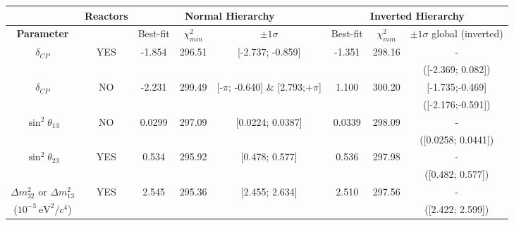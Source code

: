 \begin{table}[htb]
\centering
\begin{tabular}{| c | c || c | c | c || c | c | c |}
\hline
								& {\bf Reactors}		& \multicolumn{3}{c||}{\bf Normal Hierarchy} & \multicolumn{3}{c|}{\bf Inverted Hierarchy} \\
\hline										
\bf Parameter						&				& Best-fit	& $\chi^2_{min}$	& $\pm 1\sigma$ 	  	 	& Best-fit		& $\chi^2_{min}$ 	& $\pm 1\sigma$ global (inverted) 	 \\
\hline
$\delta_{CP}$             				& YES      			& -1.854  	& 296.51			& [-2.737; -0.859]			& -1.351		& 298.16			& -							\\
								& 				& 		& 				& 						& 			& 				& ([-2.369; 0.082])				\\ 
\hline
$\delta_{CP}$            				& NO        			& -2.231  	& 299.49			& [-$\pi$; -0.640]  \& [2.793;+$\pi$]	& 1.100	& 300.20			& [-1.735;-0.469]				\\
								& 				& 		& 				& 						& 			& 				& ([-2.176;-0.591]) 				\\ 
\hline
$\sin^2 \theta_{13}$    				& NO             		& 0.0299  	& 297.09			& [0.0224; 0.0387]	        		& 0.0339		& 298.09			& -							\\
								& 				& 		& 				& 						& 			& 				& ([0.0258; 0.0441]) 				\\ 
\hline
$\sin^2 \theta_{23}$                      		& YES       		& 0.534	& 295.92			& [0.478; 0.577]			& 0.536		& 297.98			& -                 					\\
								& 				& 		& 				& 						& 			& 				& ([0.482; 0.577])			  	\\ 
\hline
$\Delta m^2_{32}$ or $\Delta m^2_{13}$   & YES  			& 2.545 	& 295.36 			& [2.455; 2.634]			& 2.510 		& 297.56			& -     						\\
($10^{-3} ~\text{eV}^2 / c^4$) 			& 			& 		&				&						&			&				& ([2.422; 2.599])							\\


\end{tabular}
\end{table}
